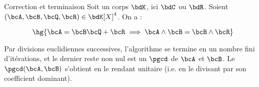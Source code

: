 \documentclass[a4paper,french,bookmarks]{article}
\begin{document}
\begin{property}{Correction et terminaison}
    Soit un corps $\bdK$, ici $\bdC$ ou $\bdR$. Soient $(\bcA, \bcB, \bcQ, \bcR) \in \bdK[X]^4$. On a :
    
    \[\hg{\bcA = \bcB\bcQ + \bcR \implies \bcA \wedge \bcB = \bcB \wedge \bcR}\]
    
    Par divisions euclidiennes successives, l'algorithme se termine en un nombre fini d'itérations, et le dernier reste non nul est un $\pgcd$ de $\bcA$ et $\bcB$. Le $\pgcd(\bcA, \bcB)$ s'obtient en le rendant unitaire (i.e. en le divisant par son coefficient dominant).
\end{property}
\end{document}
